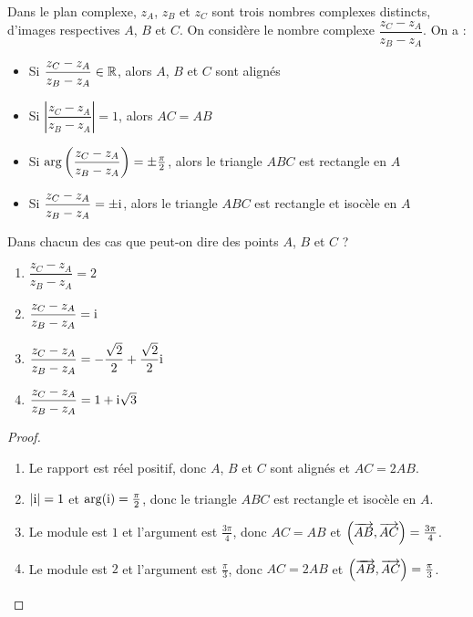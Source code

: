 \begin{methode}
Dans le plan complexe, $z_A$, $z_B$ et $z_C$ sont trois nombres complexes distincts, d'images respectives $A$, $B$ et $C$. On considère le nombre complexe $\dfrac{z_C - z_A}{z_B - z_A}$. On a :

\begin{itemize}
\item Si $\dfrac{z_C - z_A}{z_B - z_A} \in \mathbb{R}$, alors $A$, $B$ et $C$ sont alignés
\item Si $\left|\dfrac{z_C - z_A}{z_B - z_A}\right| = 1$, alors $AC = AB$
\item Si $\arg\left(\dfrac{z_C - z_A}{z_B - z_A}\right) = \pm\frac{\pi}{2}$, alors le triangle $ABC$ est rectangle en $A$
\item Si $\dfrac{z_C - z_A}{z_B - z_A} = \pm\text{i}$, alors le triangle $ABC$ est rectangle et isocèle en $A$
\end{itemize}
\end{methode}

\begin{example}
Dans chacun des cas que peut-on dire des points $A$, $B$ et $C$ ?
\begin{enumerate}
\item $\dfrac{z_C - z_A}{z_B - z_A} = 2$
\item $\dfrac{z_C - z_A}{z_B - z_A} = \text{i}$
\item $\dfrac{z_C - z_A}{z_B - z_A} = -\dfrac{\sqrt{2}}{2} + \dfrac{\sqrt{2}}{2}\text{i}$
\item $\dfrac{z_C - z_A}{z_B - z_A} = 1 + \text{i}\sqrt{3}$
\end{enumerate}

\begin{proof}
\begin{enumerate}
\item Le rapport est réel positif, donc $A$, $B$ et $C$ sont alignés et $AC = 2AB$.
\item $|\text{i}| = 1$ et $\arg(\text{i}) = \frac{\pi}{2}$, donc le triangle $ABC$ est rectangle et isocèle en $A$.
\item Le module est $1$ et l'argument est $\frac{3\pi}{4}$, donc $AC = AB$ et $\left(\overrightarrow{AB}, \overrightarrow{AC}\right) = \frac{3\pi}{4}$.
\item Le module est $2$ et l'argument est $\frac{\pi}{3}$, donc $AC = 2AB$ et $\left(\overrightarrow{AB}, \overrightarrow{AC}\right) = \frac{\pi}{3}$.
\end{enumerate}
\end{proof}
\end{example}




